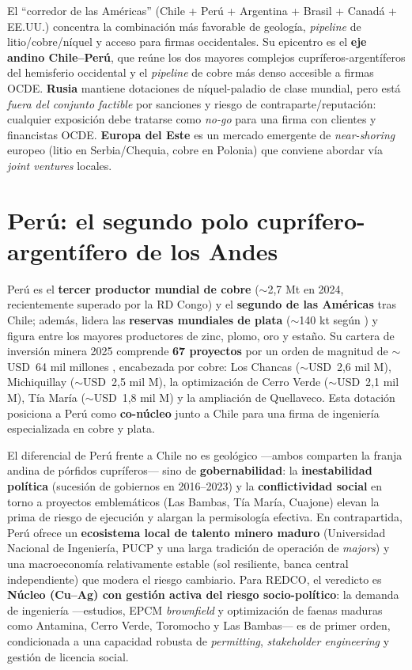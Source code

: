 \documentclass[11pt,letterpaper]{report}
\begin{document}
\begin{cajahallazgo}
El ``corredor de las Américas'' (Chile + Perú + Argentina + Brasil + Canadá + EE.UU.) concentra la combinación más favorable de
geología, \emph{pipeline} de litio/cobre/níquel y acceso para firmas occidentales. Su epicentro es el \textbf{eje andino
Chile--Perú}, que reúne los dos mayores complejos cupríferos-argentíferos del hemisferio occidental y el \emph{pipeline} de cobre
más denso accesible a firmas OCDE. \textbf{Rusia} mantiene dotaciones de níquel-paladio de clase mundial, pero está \emph{fuera del
conjunto factible} por sanciones y riesgo de contraparte/reputación: cualquier exposición debe tratarse como \emph{no-go} para una
firma con clientes y financistas OCDE. \textbf{Europa del Este} es un mercado emergente de \emph{near-shoring} europeo (litio en
Serbia/Chequia, cobre en Polonia) que conviene abordar vía \emph{joint ventures} locales.
\end{cajahallazgo}

\section{Perú: el segundo polo cuprífero-argentífero de los Andes}
Perú es el \textbf{tercer productor mundial de cobre} ($\sim$2{,}7 Mt en 2024, recientemente superado por la RD Congo) y el
\textbf{segundo de las Américas} tras Chile; además, lidera las \textbf{reservas mundiales de plata} ($\sim$140 kt según
\citet{usgs_mcs2025}) y figura entre los mayores productores de zinc, plomo, oro y estaño. Su cartera de inversión minera
2025 comprende \textbf{67 proyectos} por un orden de magnitud de $\sim$USD~64 mil millones \citep{minem2025}, encabezada por cobre:
Los Chancas ($\sim$USD~2{,}6 mil M), Michiquillay ($\sim$USD~2{,}5 mil M), la optimización de Cerro Verde ($\sim$USD~2{,}1 mil M),
Tía María ($\sim$USD~1{,}8 mil M) y la ampliación de Quellaveco. Esta dotación posiciona a Perú como \textbf{co-núcleo} junto a
Chile para una firma de ingeniería especializada en cobre y plata.

El diferencial de Perú frente a Chile no es geológico ---ambos comparten la franja andina de pórfidos cupríferos--- sino de
\textbf{gobernabilidad}: la \textbf{inestabilidad política} (sucesión de gobiernos en 2016--2023) y la \textbf{conflictividad
social} en torno a proyectos emblemáticos (Las Bambas, Tía María, Cuajone) elevan la prima de riesgo de ejecución y alargan la
permisología efectiva. En contrapartida, Perú ofrece un \textbf{ecosistema local de talento minero maduro} (Universidad Nacional
de Ingeniería, PUCP y una larga tradición de operación de \emph{majors}) y una macroeconomía relativamente estable (sol resiliente,
banca central independiente) que modera el riesgo cambiario. Para REDCO, el veredicto es \textbf{Núcleo (Cu--Ag) con gestión activa
del riesgo socio-político}: la demanda de ingeniería ---estudios, EPCM \emph{brownfield} y optimización de faenas maduras como
Antamina, Cerro Verde, Toromocho y Las Bambas--- es de primer orden, condicionada a una capacidad robusta de \emph{permitting},
\emph{stakeholder engineering} y gestión de licencia social.
\end{document}
